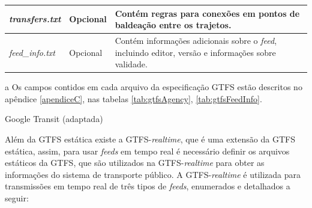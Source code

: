 \documentclass[
	12pt,				%
	oneside,			%
	a4paper,			%
	english,			%
	brazil				%
	]{abntex2ppgsi}
\begin{document}
{{\begin{table}[!htb]
\begin{threeparttable}
\begin{tabular}{>{\centering\arraybackslash}m{3.5cm} | >{\centering}m{3cm} | >{\centering\arraybackslash}m{8cm}}
\hline
\textit{transfers.txt }& Opcional & Contém regras para conexões em pontos de baldeação entre os trajetos. \\
\hline
\textit{feed\_info.txt} & Opcional & Contém informações adicionais sobre o \textit{feed}, incluindo editor, versão e informações sobre validade. \\
\bottomrule
  \end{tabular}
  \begin{tablenotes}
            \item[a] Os campos contidos em cada arquivo da especificação GTFS estão descritos no apêndice \ref{apendiceC}, nas tabelas \ref{tab:gtfsAgency}, \ref{tab:gtfsFeedInfo}.
        \end{tablenotes}
\end{threeparttable}
 Google Transit (adaptada)
\end{table}

Além da GTFS estática existe a GTFS-\textit{realtime}, que é uma extensão da GTFS estática, assim, para usar \textit{feeds} em tempo real é necessário definir os arquivos estáticos da GTFS, que são utilizados na GTFS-\textit{realtime} para obter as informações do sistema de transporte público. A GTFS-\textit{realtime} é utilizada para transmissões em tempo real de três tipos de \textit{feeds}, enumerados e detalhados a seguir:

}}
\end{document}
